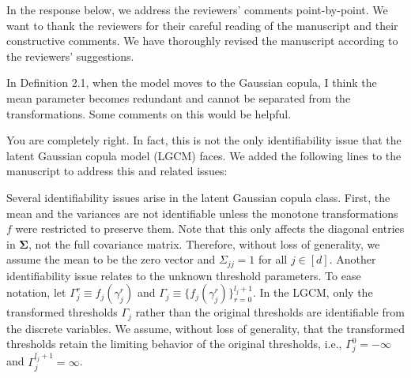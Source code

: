 In the response below, we address the reviewers' comments point-by-point. We want to thank the reviewers for their careful reading of the manuscript and their constructive comments. We have thoroughly revised the manuscript according to the reviewers' suggestions.

\reviewersection


\begin{point}
    In Definition 2.1, when the model moves to the Gaussian copula, I think the mean parameter becomes redundant and cannot be separated from the transformations. Some comments on this would be helpful.
\end{point}

\begin{reply}
    You are completely right. In fact, this is not the only identifiability issue that the latent Gaussian copula model (LGCM) faces. We added the following lines to the manuscript to address this and related issues:
\end{reply}


\begin{change}
    Several identifiability issues arise in the latent Gaussian copula class.
    First, the mean and the variances are not identifiable unless the monotone transformations \(f\) were restricted to preserve them. Note that this only affects the diagonal entries in \(\mathbf\Sigma\), not the full covariance matrix. Therefore, without loss of generality, we assume the mean to be the zero vector and \(\Sigma_{jj} = 1\) for all \(j \in [d]\). Another identifiability issue relates to the unknown threshold parameters. To ease notation, let \(\Gamma_j^r \equiv f_j(\gamma_j^r)\) and \(\Gamma_j \equiv \{f_j(\gamma_j^r)\}_{r=0}^{l_j+1}\). In the LGCM, only the transformed thresholds \(\Gamma_j\) rather than the original thresholds are identifiable from the discrete variables. We assume, without loss of generality, that the transformed thresholds retain the limiting behavior of the original thresholds, i.e., \(\Gamma_{j}^{0} = -\infty\) and \(\Gamma_j^{l_j+1} = \infty\).
\end{change}


